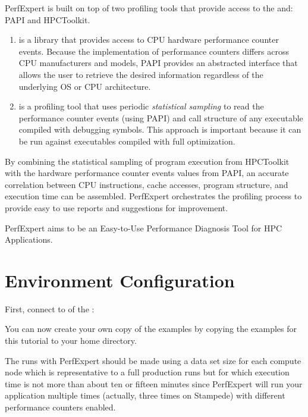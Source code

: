 PerfExpert is built on top of two profiling tools that provide access to the and: PAPI and HPCToolkit.

\begin{enumerate}
  \item  {} is a library that provides access to CPU hardware performance counter events. Because the implementation of performance counters differs across CPU manufacturers and models, PAPI provides an abstracted interface that allows the user to retrieve the desired information regardless of the underlying OS or CPU architecture.
  \item  {} is a profiling tool that uses periodic \emph{statistical sampling} to read the performance counter events (using PAPI) and call structure of any executable compiled with debugging symbols. This approach is important because it can be run against executables compiled with full optimization.
\end{enumerate}

By combining the statistical sampling of program execution from HPCToolkit with the hardware performance counter events values from PAPI, an accurate correlation between CPU instructions, cache accesses, program structure, and execution time can be assembled. PerfExpert orchestrates the profiling process to provide easy to use reports and suggestions for improvement.

 PerfExpert aims to be an Easy-to-Use Performance Diagnosis Tool for HPC Applications.

\section{Environment Configuration}
\label{sec:Environment_Configuration}

First, connect to \hpcname of the \university:
\begin{prompt}
\end{prompt}

You can now create your own copy of the examples by copying the examples for this tutorial to your home directory.
\begin{prompt}
\end{prompt}

The runs with PerfExpert should be made using a data set size for each compute node which is representative to a full production runs but for which execution time is not more than about ten or fifteen minutes since PerfExpert will run your application multiple times (actually, three times on Stampede) with different performance counters enabled.

